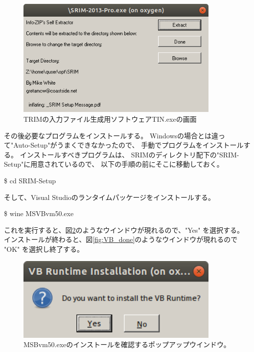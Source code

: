 \documentclass [11pt,a4paper,dvipdfmx] {jarticle}
\begin{document}
\begin{figure}[H]
    \centering
    \includegraphics[width=10cm]{./pic/SRIM_extract.png}
    \caption{TRIMの入力ファイル生成用ソフトウェアTIN.exeの画面}
    \label{fig:reflectivity}
\end{figure}



その後必要なプログラムをインストールする。
Windowsの場合とは違って"Auto-Setup"がうまくできなかったので、
手動でプログラムをインストールする。
インストールすべきプログラムは、
SRIMのディレクトリ配下の"SRIM-Setup"に用意されているので、
以下の手順の前にそこに移動しておく。

\begin{screen}[4]
    \$ cd SRIM-Setup
\end{screen}

そして、Visual Studioのランタイムパッケージをインストールする。
\begin{screen}[4]
    \$ wine MSVBvm50.exe
\end{screen}
これを実行すると、図\ref{fig:VB_inquiry}のようなウインドウが現れるので、"Yes" を選択する。
インストールが終わると、図\ref{fig:VB_done}のようなウインドウが現れるので "OK" を選択し終了する。


\begin{figure}[H]
    \centering
    \includegraphics[width=10cm]{./pic/VB_runtime_inquiry.png}
    \caption{MSBvm50.exeのインストールを確認するポップアップウインドウ。}
    \label{fig:VB_inquiry}
\end{figure}
\end{document}
